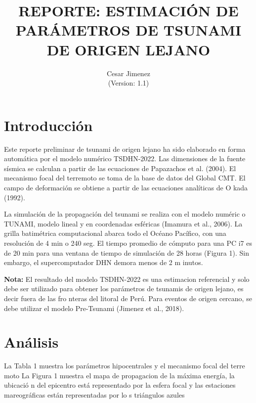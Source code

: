 \documentclass[a4paper,11pt]{article}
\title{REPORTE: ESTIMACIÓN DE PARÁMETROS DE TSUNAMI DE ORIGEN LEJANO}
\author{Cesar Jimenez \\
 (Version: 1.1)}
\begin{document}
 \renewcommand{\tablename}{Tabla}
 \maketitle
 \section*{Introducción}
 \noindent
 Este reporte preliminar de tsunami de origen lejano ha sido 
 elaborado en forma automática por el modelo numérico TSDHN-2022.
 Las dimensiones de la fuente sísmica se calculan a partir de las ecuaciones de
  Papazachos et al. (2004).
 El mecanismo focal del terremoto se toma de la base de datos del Global CMT.
 El campo de deformación se obtiene a partir de las ecuaciones analíticas de O
 kada (1992).
  
 La simulación de la propagación del tsunami se realiza con el modelo numéric
 o TUNAMI,
 modelo lineal y en coordenadas esféricas (Imamura et al., 2006).
 La grilla batimétrica computacional abarca todo el Océano Pacífico, con una 
 resolución de 4 min o 240 seg.
 El tiempo promedio de cómputo para una PC i7 es de 20 min para una ventana de 
 tiempo de simulación
 de 28 horas (Figura 1). Sin embargo, el supercomputador DHN demora menos de 2 m
 inutos.
  
 \textbf{Nota:} El resultado del modelo TSDHN-2022 es una estimacion referencial
  y solo debe ser utilizado para
 obtener los parámetros de tsunamis de origen lejano, es decir fuera de las fro
 nteras del litoral de Perú.
 Para eventos de origen cercano, se debe utilizar el modelo Pre-Tsunami (Jimenez
  et al., 2018).
 \section*{Análisis}
 La Tabla 1 muestra los parámetros hipocentrales y el mecanismo focal del terre
 moto
 La Figura 1 muestra el mapa de propagacion de la máxima energía, la ubicació
 n del epicentro está representado
 por la esfera focal y las estaciones mareográficas están representadas por lo
 s triángulos azules
  
\end{document}
